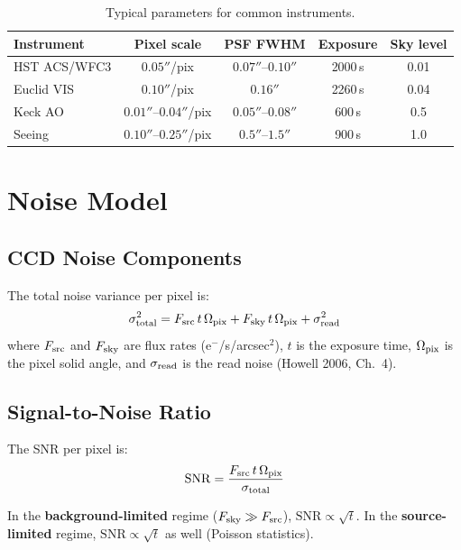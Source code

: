 \documentclass[11pt, letterpaper]{article}
\begin{document}
\begin{table}[H]
\centering
\caption{Typical parameters for common instruments.}
\begin{tabular}{lcccc}
\toprule
Instrument & Pixel scale & PSF FWHM & Exposure & Sky level \\
\midrule
HST ACS/WFC3 & $0.05''$/pix & $0.07''$--$0.10''$ & 2000\,s & 0.01 \\
Euclid VIS   & $0.10''$/pix & $0.16''$           & 2260\,s & 0.04 \\
Keck AO      & $0.01''$--$0.04''$/pix & $0.05''$--$0.08''$ & 600\,s & 0.5 \\
Seeing       & $0.10''$--$0.25''$/pix & $0.5''$--$1.5''$ & 900\,s & 1.0 \\
\bottomrule
\end{tabular}
\label{tab:instruments}
\end{table}

\section{Noise Model}
\label{sec:noise}

\subsection{CCD Noise Components}

The total noise variance per pixel is:
\begin{equation}
\sigma_{\rm total}^2 = F_{\rm src}\,t\,\Omega_{\rm pix}
+ F_{\rm sky}\,t\,\Omega_{\rm pix} + \sigma_{\rm read}^2
\label{eq:noise-model}
\end{equation}
where $F_{\rm src}$ and $F_{\rm sky}$ are flux rates
(e$^-$/s/arcsec$^2$), $t$ is the exposure time, $\Omega_{\rm pix}$ is
the pixel solid angle, and $\sigma_{\rm read}$ is the read noise
(Howell 2006, Ch.~4).

\subsection{Signal-to-Noise Ratio}

The SNR per pixel is:
\begin{equation}
\mathrm{SNR} = \frac{F_{\rm src}\,t\,\Omega_{\rm pix}}{\sigma_{\rm total}}
\label{eq:snr}
\end{equation}

In the \textbf{background-limited} regime ($F_{\rm sky} \gg F_{\rm src}$),
$\mathrm{SNR} \propto \sqrt{t}$. In the \textbf{source-limited} regime,
$\mathrm{SNR} \propto \sqrt{t}$ as well (Poisson statistics).
\end{document}
